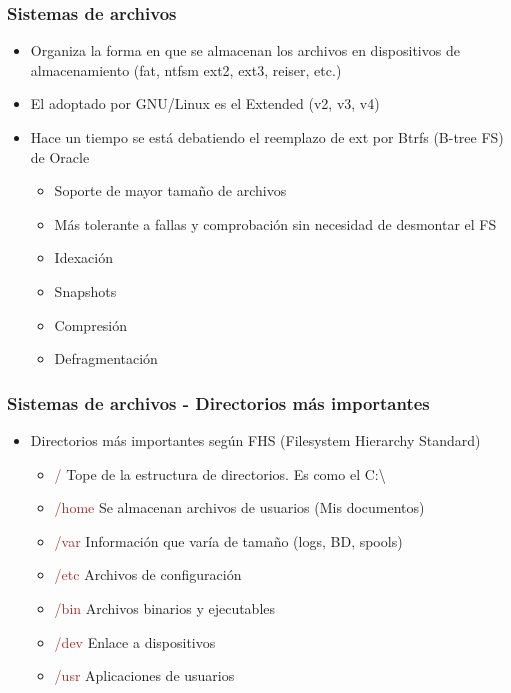 \begin{frame}
	\frametitle{Sistemas de archivos}
	\begin{itemize}
		\item Organiza la forma en que se almacenan los archivos en dispositivos de almacenamiento (fat, ntfsm ext2, ext3, reiser, etc.)
		\item El adoptado por GNU/Linux es el Extended (v2, v3, v4)
		\item Hace un tiempo se está debatiendo el reemplazo de ext por Btrfs (B-tree FS) de Oracle
		\begin{itemize}
			\item Soporte de mayor tamaño de archivos
			\item Más tolerante a fallas y comprobación sin necesidad de desmontar el FS
			\item Idexación
			\item Snapshots
			\item Compresión
			\item Defragmentación
		\end{itemize}
	\end{itemize}
\end{frame}

\begin{frame}
	\frametitle{Sistemas de archivos - Directorios más importantes}
	\begin{itemize}
		\item Directorios más importantes según FHS (Filesystem Hierarchy Standard)
		\begin{itemize}
			\item \textcolor{brown}{/} Tope de la estructura de directorios. Es como el C:\textbackslash
			\item \textcolor{brown}{/home} Se almacenan archivos de usuarios (Mis documentos)
			\item \textcolor{brown}{/var} Información que varía de tamaño (logs, BD, spools)
			\item \textcolor{brown}{/etc} Archivos de configuración
			\item \textcolor{brown}{/bin} Archivos binarios y ejecutables
			\item \textcolor{brown}{/dev} Enlace a dispositivos
			\item \textcolor{brown}{/usr} Aplicaciones de usuarios
		\end{itemize}
	\end{itemize}
\end{frame}

